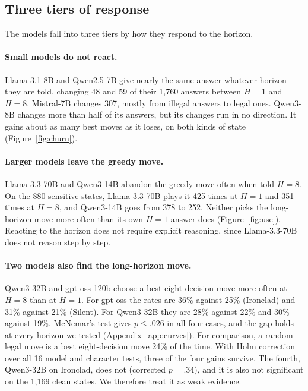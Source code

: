 \subsection{Three tiers of response}

The models fall into three tiers by how they respond to the horizon.

\paragraph{Small models do not react.} Llama-3.1-8B and Qwen2.5-7B give nearly the same answer whatever horizon they are told, changing 48 and 59 of their 1,760 answers between $H{=}1$ and $H{=}8$. Mistral-7B changes 307, mostly from illegal answers to legal ones. Qwen3-8B changes more than half of its answers, but its changes run in no direction. It gains about as many best moves as it loses, on both kinds of state (Figure~\ref{fig:churn}).

\paragraph{Larger models leave the greedy move.} Llama-3.3-70B and Qwen3-14B abandon the greedy move often when told $H{=}8$. On the 880 sensitive states, Llama-3.3-70B plays it 425 times at $H{=}1$ and 351 times at $H{=}8$, and Qwen3-14B goes from 378 to 252. Neither picks the long-horizon move more often than its own $H{=}1$ answer does (Figure~\ref{fig:use}). Reacting to the horizon does not require explicit reasoning, since Llama-3.3-70B does not reason step by step.

\paragraph{Two models also find the long-horizon move.} Qwen3-32B and gpt-oss-120b choose a best eight-decision move more often at $H{=}8$ than at $H{=}1$. For gpt-oss the rates are 36\% against 25\% (Ironclad) and 31\% against 21\% (Silent). For Qwen3-32B they are 28\% against 22\% and 30\% against 19\%. McNemar's test gives $p \le .026$ in all four cases, and the gap holds at every horizon we tested (Appendix~\ref{app:curves}). For comparison, a random legal move is a best eight-decision move 24\% of the time. With Holm correction over all 16 model and character tests, three of the four gains survive. The fourth, Qwen3-32B on Ironclad, does not (corrected $p=.34$), and it is also not significant on the 1,169 clean states. We therefore treat it as weak evidence.

